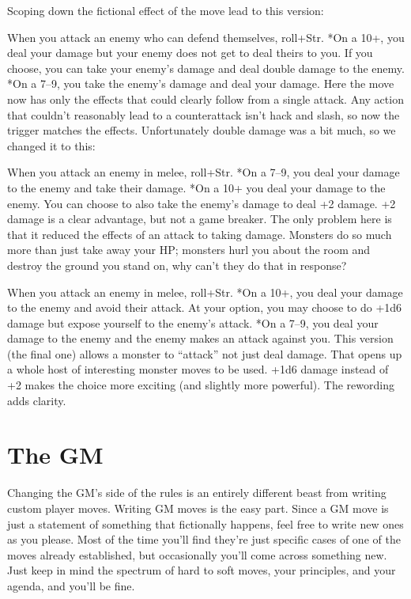 Scoping down the fictional effect of the move lead to this version:


\HRule
When you attack an enemy who can defend themselves, roll+Str. *On a 10+, you deal your damage but your enemy does not get to deal theirs to you. If you choose, you can take your enemy's damage and deal double damage to the enemy. *On a 7--9, you take the enemy's damage and deal your damage.
\HRule
Here the move now has only the effects that could clearly follow from a single attack. Any action that couldn't reasonably lead to a counterattack isn't hack and slash, so now the trigger matches the effects. Unfortunately double damage was a bit much, so we changed it to this:


\HRule
When you attack an enemy in melee, roll+Str. *On a 7--9, you deal your damage to the enemy and take their damage. *On a 10+ you deal your damage to the enemy. You can choose to also take the enemy's damage to deal +2 damage.
\HRule
+2 damage is a clear advantage, but not a game breaker. The only problem here is that it reduced the effects of an attack to taking damage. Monsters do so much more than just take away your HP; monsters hurl you about the room and destroy the ground you stand on, why can't they do that in response?


\HRule
When you attack an enemy in melee, roll+Str. *On a 10+, you deal your damage to the enemy and avoid their attack. At your option, you may choose to do +1d6 damage but expose yourself to the enemy's attack. *On a 7--9, you deal your damage to the enemy and the enemy makes an attack against you.
\HRule
This version (the final one) allows a monster to ``attack'' not just deal damage. That opens up a whole host of interesting monster moves to be used. +1d6 damage instead of +2 makes the choice more exciting (and slightly more powerful). The rewording adds clarity.
\section*{The GM}


Changing the GM's side of the rules is an entirely different beast from writing custom player moves. Writing GM moves is the easy part. Since a GM move is just a statement of something that fictionally happens, feel free to write new ones as you please. Most of the time you'll find they're just specific cases of one of the moves already established, but occasionally you'll come across something new. Just keep in mind the spectrum of hard to soft moves, your principles, and your agenda, and you'll be fine.


